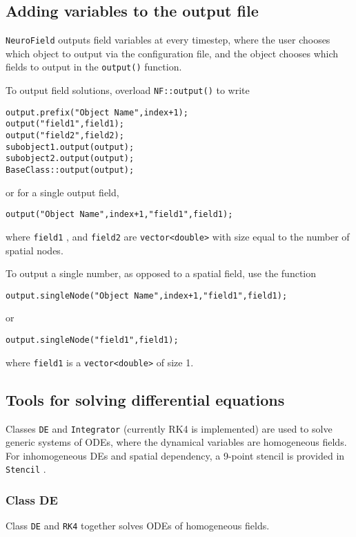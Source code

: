 \documentclass[12pt,a4paper]{article}
\newcommand{\type}[1]{{\small\small\tt #1} }
\newcommand{\NF}[0]{\type{NeuroField}}
\begin{document}
\subsection{Adding variables to the output file}
\label{sec:output}

\NF outputs field variables at every timestep, where the user chooses which object to output via the configuration file, and the object chooses which fields to output in the \type{output()} function.

To output field solutions, overload \type{NF::output()} to write
\begin{lstlisting}
output.prefix("Object Name",index+1);
output("field1",field1);
output("field2",field2);
subobject1.output(output);
subobject2.output(output);
BaseClass::output(output);
\end{lstlisting}
or for a single output field,
\begin{lstlisting}
output("Object Name",index+1,"field1",field1);
\end{lstlisting}

where \type{field1}, and \type{field2} are \type{vector<double>} with size equal to the number of spatial nodes.

To output a single number, as opposed to a spatial field, use the function
\begin{lstlisting}
output.singleNode("Object Name",index+1,"field1",field1);
\end{lstlisting}
or
\begin{lstlisting}
output.singleNode("field1",field1);
\end{lstlisting}
where \type{field1} is a \type{vector<double>} of size 1.

\subsection{Tools for solving differential equations}
\label{sec:diffeqn}

Classes \type{DE} and \type{Integrator} (currently RK4 is implemented) are used to solve generic systems of ODEs, where the dynamical variables are homogeneous fields. For inhomogeneous DEs and spatial dependency, a 9-point stencil is provided in \type{Stencil}.

\subsubsection{Class DE}
\label{sec:de}

Class \type{DE} and \type{RK4} together solves ODEs of homogeneous fields.
\end{document}
